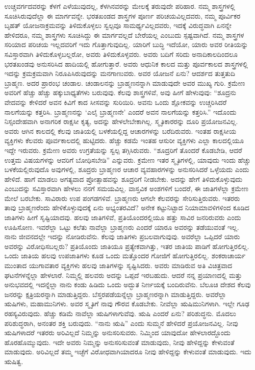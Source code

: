 ಉಚ್ಚವರ್ಗದವರನ್ನು ಕೆಳಗೆ ಎಳೆಯುವುದಲ್ಲ, ಕೆಳಗಿನವರನ್ನು ಮೇಲಕ್ಕೆ ತರುವುದೇ ಪರಿಹಾರ. ನಮ್ಮ ಶಾಸ್ತ್ರಗಳಲ್ಲಿ ಸೂಚಿಸಿರುವುದೆಲ್ಲಾ ಈ ಮಾರ್ಗವನ್ನೇ. ಭರತಖಂಡದ ಶಾಸ್ತ್ರಗಳ ಪೂರ್ಣ ಪರಿಚಯವಿಲ್ಲದವರು, ನಮ್ಮ ಪೂರ್ವಿಕರ ಬೃಹತ್​ ಯೋಜನಾಕ್ರಮವನ್ನು ತಿಳಿದುಕೊಳ್ಳಲು ಸ್ವಲ್ಪವೂ ಸಾಮರ್ಥ್ಯವಿಲ್ಲದವರು, ಇದಕ್ಕೆ ವಿರುದ್ಧವಾಗಿ ಏನನ್ನೇ ಹೇಳಿದರೂ, ನಮ್ಮ ಶಾಸ್ತ್ರಗಳು ಸೂಚಿಸಿದ್ದು ಈ ಮಾರ್ಗವಲ್ಲದೆ ಬೇರೆಯಲ್ಲ ಎಂಬುದು ಸ್ಪಷ್ಟವಾಗಿದೆ. ನಮ್ಮ ಶಾಸ್ತ್ರಗಳ ಸರಿಯಾದ ಪರಿಚಯ ಇಲ್ಲದವರಿಗೆ ಇದು ಗೊತ್ತಾಗುವುದಿಲ್ಲ. ಯಾರಿಗೆ ಬುದ್ಧಿ ಇದೆಯೋ, ಯಾರು ಅವರ ರೀತಿಯನ್ನು ಸವಿಸ್ತಾರವಾಗಿ ತಿಳಿದುಕೊಳ್ಳಬಲ್ಲರೋ, ಅವರು ತಿಳಿದುಕೊಳ್ಳವರು. ಅವರು ಬದಿಗೆ ಸರಿದು ಅನಾದಿಕಾಲದಿಂದಲೂ ಭರತಖಂಡವು ಅನುಸರಿಸಿದ ಹಾದಿಯಲ್ಲಿ ಹೋಗುತ್ತಾರೆ. ಅವರು ಆಧುನಿಕ ಕಾಲದ ಮತ್ತು ಪೂರ್ವಕಾಲದ ಶಾಸ್ತ್ರಗಳಲ್ಲಿ ಇದನ್ನು ಕ್ರಮಕ್ರಮವಾಗಿ ನಿರೂಪಿಸಿರುವುದನ್ನು ಮನಗಾಣುವರು. ಅವರ ಯೋಜನೆ ಏನು? ಆದರ್ಶದ ತುತ್ತತುದಿ ಬ್ರಾಹ್ಮಣ. ಅದರ ಪ್ರಾರಂಭ ಚಂಡಾಲ. ಚಂಡಾಲನನ್ನು ಬ್ರಾಹ್ಮಣನನ್ನಾಗಿ ಮಾಡುವುದೇ ಅವರ ಮುಖ್ಯ ಗುರಿ. ಕ್ರಮೇಣ ಅವರಿಗೆ ಹೆಚ್ಚು ಹೆಚ್ಚು ಹಕ್ಕುಬಾಧ್ಯತೆಗಳು ಬರುವುವು. ಕೆಲವು ಶಾಸ್ತ್ರಗಳಿವೆ, ಅವು ಹೀಗೆ ಹೇಳುವುವು: “ಶೂದ್ರನು ವೇದವನ್ನು ಕೇಳಿದರೆ ಅವನ ಕಿವಿಗೆ ಕಾದ ಸೀಸವನ್ನು ಸುರಿಯಿರಿ. ಅವನು ಒಂದು ಶ್ಲೋಕವನ್ನು ಉಚ್ಚರಿಸಿದರೆ ನಾಲಗೆಯನ್ನು ಕತ್ತರಿಸಿ. ಬ್ರಾಹ್ಮಣನನ್ನು ‘ಎಲೈ ಬ್ರಾಹ್ಮಣನೇ’ ಎಂದರೆ ಅವನ ನಾಲಗೆಯನ್ನು ಕತ್ತರಿಸಿ.” ಇದೊಂದು ನಿಸ್ಸಂದೇಹವಾಗಿ ಅನಾಗರಿಕ ರಾಕ್ಷಸೀ ಕೃತ್ಯ, ಅದನ್ನು ಹೇಳಲೇಬೇಕಾಗಿಲ್ಲ. ಸ್ಮೃತಿಕಾರರನ್ನು ದೂರಿ ಪ್ರಯೋಜನವಿಲ್ಲ. ಅವರು ಆಗಿನ ಕಾಲದಲ್ಲಿ ಕೆಲವು ಜಾತಿಯಲ್ಲಿ ಬಳಕೆಯಲ್ಲಿದ್ದ ಆಚಾರಗಳನ್ನು ಬರೆದಿರುವರು. ಇಂತಹ ರಾಕ್ಷಸೀಯ ವ್ಯಕ್ತಿಗಳು ಕೆಲವರು ಪೂರ್ವಕಾಲದಲ್ಲಿ ಹುಟ್ಟಿದರು. ಹೆಚ್ಚು ಕಡಮೆ ಇಂತಹ ಆಸುರೀ ವ್ಯಕ್ತಿಗಳು ಎಲ್ಲಾ ಕಾಲದಲ್ಲಿಯೂ ಇದ್ದೇ ಇರುವರು. ಕ್ರಮೇಣ ಅವರು ಉಗ್ರತೆಯನ್ನು ಸ್ವಲ್ಪ ತಗ್ಗಿಸಿರುವರು. “ಶೂದ್ರರಿಗೆ ತೊಂದರೆ ಕೊಡಬೇಡಿ, ಆದರೆ ಉತ್ತಮ ವಿಷಯಗಳನ್ನು ಆವರಿಗೆ ಬೋಧಿಸಬೇಡಿ” ಎನ್ನುವರು. ಕ್ರಮೇಣ ಇತರ ಸ್ಮೃತಿಗಳಲ್ಲಿ, ಯಾವುದು ಇಂದು ಹೆಚ್ಚು ಬಳಕೆಯಲ್ಲಿರುವುದೊ ಅವುಗಳಲ್ಲಿ, ಶೂದ್ರರು ಬ್ರಾಹ್ಮಣರ ಆಚಾರ ವ್ಯವಹಾರಗಳನ್ನು ಅನುಸರಿಸಿದರೆ ಒಳ್ಳೆಯದು ಎಂದು ಹೇಳಿದೆ. ಹಾಗೆ ಮಾಡಲು ಅಗತ್ಯವಾದ ಪ್ರೋತ್ಸಾಹವನ್ನು ಶೂದ್ರರಿಗೆ ನೀಡಬೇಕು. ಅದನ್ನು ಹೇಗೆ ತಿಳಿದುಕೊಳ್ಳುವುದು ಎಂಬುದನ್ನು ಸವಿಸ್ತಾರವಾಗಿ ಹೇಳಲು ನನಗೆ ಸಮಯವಿಲ್ಲ. ವಾಸ್ತವಿಕ ಅಂಶಗಳಿಗೆ ಬಂದರೆ, ಈ ಜಾತಿಗಳೆಲ್ಲಾ ಕ್ರಮೇಣ ಮೇಲೆ ಬರಬೇಕು. ಸಾವಿರಾರು ಉಪ ಪಂಗಡಗಳಿವೆ. ಬ್ರಾಹ್ಮಣರು ಆಗಲೇ ಕೆಲವರನ್ನು ಸೇರಿಸುತ್ತಿರುವರು. ಇತರರು ತಾವು ಬ್ರಾಹ್ಮಣರೆಂದು ಹೇಳಿಕೊಳ್ಳುವುದಕ್ಕೆ ಏನು ಅಭ್ಯಂತರವಿದೆ? ಅನೇಕ ಕಟ್ಟುನಿಟ್ಟಾದ ನಿಯಾಮಾವಳಿಗಳಿಂದ ಕೂಡಿದ ಜಾತಿಗಳು ಹೀಗೆ ಸೃಷ್ಟಿಯಾದವು. ಹಲವು ಜಾತಿಗಳಿವೆ, ಪ್ರತಿಯೊಂದರಲ್ಲಿಯೂ ಹತ್ತು ಸಾವಿರ ಜನರಿರುವರು ಎಂದು ಊಹಿಸೋಣ. ಇವರೆಲ್ಲಾ ಒಟ್ಟು ಕಲೆತು ನಾವೆಲ್ಲಾ ಬ್ರಾಹ್ಮಣರು ಎಂದರೆ ಯಾರೂ ಅವರನ್ನು ತಡೆಯುವಂತೆ ಇಲ್ಲ. ನಾನು ಜೀವನದಲ್ಲೇ ಇದನ್ನು ನೋಡಿರುವೆನು. ಕೆಲವು ಜಾತಿಗಳು ಪ್ರಬಲವಾಗುವುವು. ಅವರೆಲ್ಲಾ ಒಪ್ಪಿದರೆ ಯಾರು ಅವರನ್ನು ವಿರೋಧಿಸಬಲ್ಲರು? ಪ್ರತಿಯೊಂದು ಜಾತಿಯೂ ಪ್ರತ್ಯೇಕವಾಗಿತ್ತು, ಇತರ ಜಾತಿಯ ಪಾಡಿಗೆ ಹೋಗುತ್ತಿರಲಿಲ್ಲ. ಒಂದು ಜಾತಿಯ ಹಲವು ಉಪಜಾತಿಗಳು ಕೂಡ ಒಂದು ಮತ್ತೊಂದರ ಗೋಜಿಗೆ ಹೋಗುತ್ತಿರಲಿಲ್ಲ. ಶಂಕರಾಚಾರ್ಯ ಮುಂತಾದ ಯುಗಾವತಾರ ವ್ಯಕ್ತಿಗಳು ಹಲವು ಜಾತಿಗಳನ್ನು ಸೃಷ್ಟಿಸಿದರು. ಅವರು ಮಾಡಿರುವ ಅತಿ ವಿಚಿತ್ರವಾದ ಘಟನೆಗಳನ್ನೆಲ್ಲಾ ಹೇಳಲಾರೆ. ನಿಮ್ಮಲ್ಲಿ ಹಲವರು ಅದನ್ನು ಒಪ್ಪದೆ ಇರಬಹುದು. ಆದರೆ ನನ್ನ ಪ್ರಯಾಣದಲ್ಲಿ ಮತ್ತು ಅನುಭವದಲ್ಲಿ ಇದನ್ನೆಲ್ಲಾ ನಾನು ಕಂಡು ಹಿಡಿದು ಒಂದು ಅದ್ಭುತ ನಿರ್ಣಯಕ್ಕೆ ಬಂದಿರುವೆನು. ಬೆಲೂಚಿ ದೇಶದ ಕೆಲವು ಜನರನ್ನು ಕ್ಷತ್ರಿಯರನ್ನಾಗಿ ಮಾಡುತ್ತಿದ್ದರು. ಬೆಸ್ತರಪಡೆಯನ್ನೆಲ್ಲಾ ಬ್ರಾಹ್ಮಣರನ್ನಾಗಿ ಮಾಡುತ್ತಿದ್ದರು. ಅವರೆಲ್ಲಾ ಋಷಿಗಳು, ಮಹಾಮುನಿಗಳು. ಅವರ ಸ್ಮೃತಿಗೆ ನಾವು ಗೌರವ ಕೊಡಬೇಕು. ನೀವೆಲ್ಲಾ ಋಷಿಮುನಿಗಳಾಗಿ. ಇಲ್ಲೇ ಗೂಢ ರಹಸ್ಯವಿರುವುದು. ಹೆಚ್ಚು ಕಡಿಮೆ ನಾವೆಲ್ಲಾ ಋಷಿಗಳಾಗುವೆವು. ಋಷಿ ಎಂದರೆ ಏನು? ಪರಿಶುದ್ಧನು. ಮೊದಲು ಪರಿಶುದ್ಧರಾಗಿ, ಅನಂತರ ಶಕ್ತಿ ಬರುವುದು. “ನಾನು ಋಷಿ” ಎಂದು ಸುಮ್ಮನೆ ಹೇಳಿದರೆ ಪ್ರಯೋಜನವಿಲ್ಲ. ನೀವು ಋಷಿಗಳಾದರೆ ಇತರರು ಅರಿವಿಲ್ಲದೆ ನಿಮ್ಮನ್ನು ಅನುಸರಿಸುವರು. ನಿಮ್ಮಿಂದ ಯಾವುದೋ ಹೇಳಲಾರದ್ದೊಂದು ಹೊರಹೊಮ್ಮುವುದು. ಇದೇ ಅವರು ನಿಮ್ಮನ್ನು ಅನುಸರಿಸುವಂತೆ ಮಾಡುವುದು, ನೀವು ಹೇಳಿದ್ದನ್ನು ಕೇಳುವಂತೆ ಮಾಡುವುದು. ಅರಿವಿಲ್ಲದೆ ತಮ್ಮ ಇಚ್ಛೆಗೆ ವಿರೋಧವಾಗಿಯಾದರೂ ನೀವು ಹೇಳಿದ್ದನ್ನು ಕೇಳುವಂತೆ ಮಾಡುವುದು. ಇದು ಋಷಿತ್ವ. 

